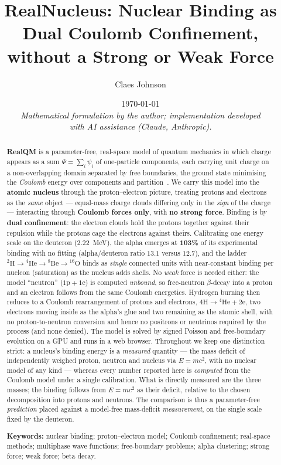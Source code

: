 \documentclass[11pt]{article}
\title{RealNucleus: Nuclear Binding as Dual Coulomb Confinement,\\ without a Strong or Weak Force}
\author[1]{Claes Johnson}
\affil[1]{KTH Royal Institute of Technology, SE-100 44 Stockholm, Sweden \\
\texttt{claesjohnson@gmail.com}}
\date{\today \\[0.4em]
\small\textit{Mathematical formulation by the author; implementation developed} \\
\small\textit{with AI assistance (Claude, Anthropic).}}
\begin{document}
\maketitle

\begin{abstract}
\textbf{RealQM} is a parameter-free, real-space model of quantum mechanics in which charge
appears as a sum $\Psi=\sum_i\psi_i$ of one-particle components, each carrying unit charge on a
non-overlapping domain separated by free boundaries, the ground state minimising the
\emph{Coulomb} energy over components and partition~\cite{Johnson-RealQM,Johnson-Book,Johnson-Atoms}.
We carry this model into the \textbf{atomic nucleus} through the proton--electron picture,
treating protons and electrons as the \emph{same} object --- equal-mass charge clouds
differing only in the \emph{sign} of the charge --- interacting through \textbf{Coulomb forces
only}, with \textbf{no strong force}. Binding is by \textbf{dual confinement}: the electron
clouds hold the protons together against their repulsion while the protons cage the electrons
against theirs. Calibrating one energy scale on the deuteron ($2.22$~MeV), the alpha emerges at
\textbf{103\%} of its experimental binding with no fitting (alpha/deuteron ratio $13.1$ versus
$12.7$), and the ladder $^2\mathrm{H}\to{}^4\mathrm{He}\to{}^8\mathrm{Be}\to{}^{16}\mathrm{O}$
binds as \emph{single} connected units with near-constant binding per nucleon (saturation) as the
nucleus adds shells. No \emph{weak} force is needed either: the model ``neutron''
($\mathrm{1p}+\mathrm{1e}$) is computed \emph{unbound}, so free-neutron $\beta$-decay into a
proton and an electron follows from the same Coulomb energetics. Hydrogen burning then reduces to
a Coulomb rearrangement of protons and electrons, $4\mathrm{H}\to{}^4\mathrm{He}+2\mathrm{e}$, two
electrons moving inside as the alpha's glue and two remaining as the atomic shell, with no
proton-to-neutron conversion and hence no positrons or neutrinos required by the process (and none
denied). The model is solved by signed
Poisson and free-boundary evolution on a GPU and runs in a web browser.
Throughout we keep one distinction strict: a nucleus's binding energy is a \emph{measured}
quantity --- the mass deficit of independently weighed proton, neutron and nucleus via $E=mc^2$,
with no nuclear model of any kind --- whereas every number reported here is \emph{computed} from
the Coulomb model under a single calibration. What is directly measured are the three
masses; the binding follows from $E=mc^2$ as their deficit, relative to the chosen decomposition
into protons and neutrons. The comparison is thus a parameter-free \emph{prediction} placed against
a model-free mass-deficit \emph{measurement}, on the single scale fixed by the deuteron.

\medskip
\noindent\textbf{Keywords:} nuclear binding; proton--electron model; Coulomb confinement;
real-space methods; multiphase wave functions; free-boundary problems; alpha clustering;
strong force; weak force; beta decay.
\end{abstract}
\end{document}
